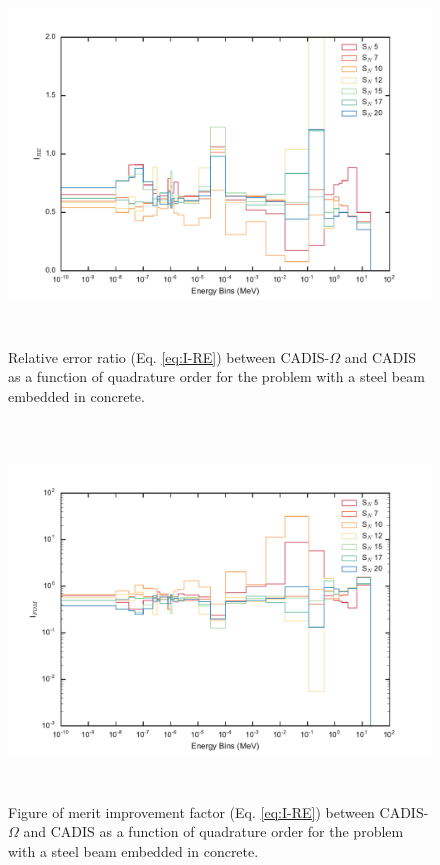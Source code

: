 \begin{figure}[h!]
  \centering
  \includegraphics[height=10cm]{./chapters/characterization_probs/figures/angle/prob_1/compare_err_quad.pdf}
  \caption[Relative error improvement factor (Eq. \eqref{eq:I-RE}) between CADIS-$\Omega$ and
  CADIS as a function of quadrature order for steel beam embedded in concrete.]
  {Relative error ratio (Eq. \eqref{eq:I-RE}) between CADIS-$\Omega$ and
   CADIS as a function of quadrature order for the problem with
   a steel beam embedded in concrete.}
  \label{fig:prob_1_quad_I_RE}
\end{figure}

\begin{figure}[h!]
  \centering
  \includegraphics[height=10cm]{./chapters/characterization_probs/figures/angle/prob_1/compare_fom_quad.pdf}
  \caption[Figure of merit improvement factor  (Eq. \eqref{eq:I-FOM}) between CADIS-$\Omega$ and
  CADIS as a function of quadrature order for steel beam embedded in concrete.]
  {Figure of merit improvement factor  (Eq. \eqref{eq:I-RE}) between CADIS-$\Omega$ and
   CADIS as a function of quadrature order for the problem with
   a steel beam embedded in concrete.}
  \label{fig:prob_1_quad_I_FOM}
\end{figure}


